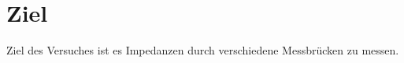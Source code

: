 \section{Ziel}
\label{sec:Ziel}

Ziel des Versuches ist es Impedanzen durch verschiedene Messbrücken zu messen.